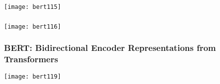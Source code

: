 \begin{frame}[fragile]\frametitle{}


			\begin{center}
			\texttt{[image: bert115]}
			\end{center}		
			

\end{frame}

\begin{frame}[fragile]\frametitle{}


			\begin{center}
			\texttt{[image: bert116]}
			\end{center}		
			

\end{frame}


			


			


\begin{frame}[fragile]\frametitle{BERT: Bidirectional Encoder Representations from Transformers}

			\begin{center}
			\texttt{[image: bert119]}
			\end{center}		
			

\end{frame}

